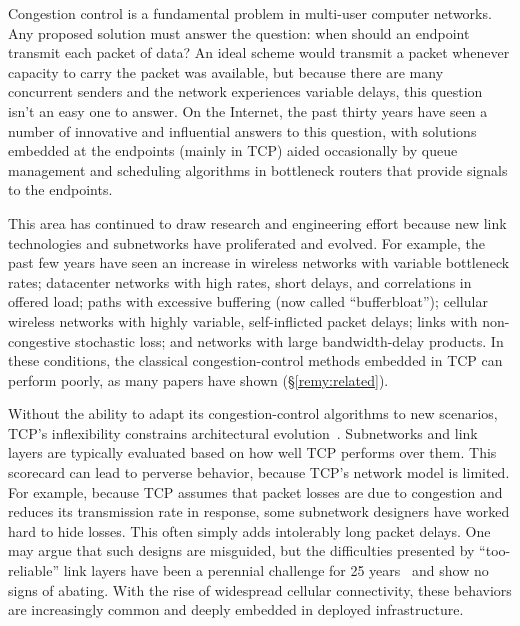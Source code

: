 Congestion control is a fundamental problem in multi-user computer
networks. Any proposed solution must answer the question: when should
an endpoint transmit each packet of data? An ideal scheme would
transmit a packet whenever capacity to carry the packet was available,
but because there are many concurrent senders and the network
experiences variable delays, this question isn't an easy one to
answer. On the Internet, the past thirty years have seen a number of
innovative and influential answers to this question, with solutions
embedded at the endpoints (mainly in TCP) aided occasionally by queue
management and scheduling algorithms in bottleneck routers that
provide signals to the endpoints.

This area has continued to draw research and engineering effort
because new link technologies and subnetworks have proliferated and
evolved. For example, the past few years have seen an increase in
wireless networks with variable bottleneck rates; datacenter networks
with high rates, short delays, and correlations in offered load; paths
with excessive buffering (now called ``bufferbloat''); cellular
wireless networks with highly variable, self-inflicted packet delays;
links with non-congestive stochastic loss; and networks with large
bandwidth-delay products. In these conditions, the classical
congestion-control methods embedded in TCP can perform poorly, as many
papers have shown (\S\ref{remy:related}).


Without the ability to adapt its congestion-control algorithms to new
scenarios, TCP's inflexibility constrains architectural
evolution~\cite{hotnets2011}. Subnetworks and link layers are
typically evaluated based on how well TCP performs over them.  This
scorecard can lead to perverse behavior, because TCP's network model
is limited. For example, because TCP assumes that packet losses are
due to congestion and reduces its transmission rate in response, some
subnetwork designers have worked hard to hide losses. This often
simply adds intolerably long packet delays. One may argue that such
designs are misguided, but the difficulties presented by
``too-reliable'' link layers have been a perennial challenge for 25
years~\cite{Clark88} and show no signs of abating. With the rise of
widespread cellular connectivity, these behaviors are increasingly
common and deeply embedded in deployed infrastructure.

